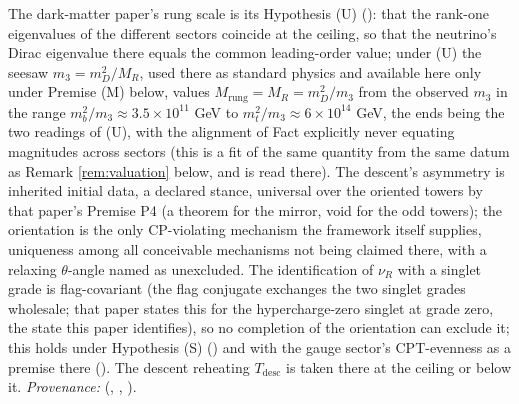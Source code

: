 The dark-matter paper's rung scale is its Hypothesis (U) (): that the rank-one eigenvalues of the different sectors coincide at the ceiling, so that the neutrino's Dirac eigenvalue there equals the common leading-order value; under (U) the seesaw $m_{3} = m_{D}^{2}/M_{R}$, used there as standard physics and available here only under Premise (M) below, values $M_{\mathrm{rung}} = M_{R} = m_{D}^{2}/m_{3}$ from the observed $m_{3}$ in the range $m_{b}^{2}/m_{3} \approx 3.5 \times 10^{11}$ GeV to $m_{t}^{2}/m_{3} \approx 6 \times 10^{14}$ GeV, the ends being the two readings of (U), with the alignment of Fact  explicitly never equating magnitudes across sectors (this is a fit of the same quantity from the same datum as Remark \ref{rem:valuation} below, and is read there). The descent's asymmetry is inherited initial data, a declared stance, universal over the oriented towers by that paper's Premise P4 (a theorem for the mirror, void for the odd towers); the orientation is the only CP-violating mechanism the framework itself supplies, uniqueness among all conceivable mechanisms not being claimed there, with a relaxing $\theta$-angle named as unexcluded. The identification of $\nu_{R}$ with a singlet grade is flag-covariant (the flag conjugate exchanges the two singlet grades wholesale; that paper states this for the hypercharge-zero singlet at grade zero, the state this paper identifies), so no completion of the orientation can exclude it; this holds under Hypothesis (S) () and with the gauge sector's CPT-evenness as a premise there (). The descent reheating $T_{\mathrm{desc}}$ is taken there at the ceiling or below it. \emph{Provenance:} \cite[Prop.~6.4, Prop.~5.1, Prop.~5.2, App.~A]{ButlerT14} (, , ).

